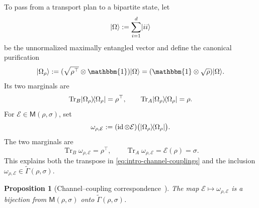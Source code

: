\documentclass[11pt]{article}
\newtheorem{proposition}[theorem]{Proposition}
\newcommand{\ketbra}[2]{\ensuremath{\ket{#1}\!\bra{#2}}}
\newcommand{\Id}{\mathbbm{1}}
\DeclarePairedDelimiter\ket{\lvert}{\rangle}
\DeclarePairedDelimiter\bra{\langle}{\rvert}
\newcommand{\calE}{\mathcal{E}}
\newcommand{\calH}{\mathcal{H}}
\begin{document}
To pass from a transport plan to a bipartite state, let
\[
    \ket{\Omega}:=\sum_{i=1}^d\ket{ii}
\]
be the unnormalized maximally entangled vector and define the canonical
purification
\begin{equation}\label{eq:canonical-purification}
    \ket{\Omega_\rho}
    :=(\sqrt{\rho^{\top}}\otimes\Id)\ket{\Omega}
    =(\Id\otimes\sqrt\rho)\ket{\Omega}.
\end{equation}
Its two marginals are
\[
    \operatorname{Tr}_B\ketbra{\Omega_\rho}{\Omega_\rho}=\rho^{\top},
    \qquad
    \operatorname{Tr}_A\ketbra{\Omega_\rho}{\Omega_\rho}=\rho.
\]
For $\calE\in\mathsf{M}(\rho,\sigma)$, set
\begin{equation}\label{eq:weighted-choi-state}
    \omega_{\rho,\calE}
    :=(\operatorname{id}\otimes\calE)
    \bigl(\ketbra{\Omega_\rho}{\Omega_\rho}\bigr).
\end{equation}
The two marginals are
\begin{equation}\label{eq:weighted-choi-marginals}
    \operatorname{Tr}_B\omega_{\rho,\calE}=\rho^{\top},
    \qquad
    \operatorname{Tr}_A\omega_{\rho,\calE}=\calE(\rho)=\sigma.
\end{equation}
This explains both the transpose in
\eqref{eq:intro-channel-couplings} and the inclusion
$\omega_{\rho,\calE}\in\widetilde\Gamma(\rho,\sigma)$.

\begin{proposition}[Channel--coupling correspondence~{\cite[Proposition~2]{DT21}}]
\label{prop:weighted-choi-correspondence}
    The map $\calE\mapsto\omega_{\rho,\calE}$ is a bijection from
    $\mathsf{M}(\rho,\sigma)$ onto
    $\widetilde\Gamma(\rho,\sigma)$.
\end{proposition}

\end{document}
